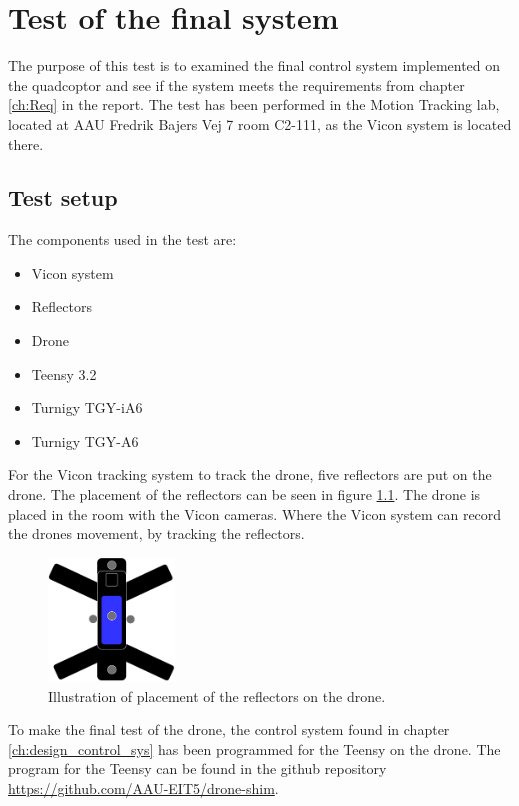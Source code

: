 \chapter{Test of the final system}\label{ap:final_test_report}

The purpose of this test is to examined the final control system implemented on the quadcoptor and see if the system meets the requirements from chapter \ref{ch:Req} in the report. The test has been performed in the Motion Tracking lab, located at AAU Fredrik Bajers Vej 7 room C2-111, as the Vicon system is located there. 


\section*{Test setup}
The components used in the test are:
\begin{itemize}
    \item{Vicon system}
    \item{Reflectors}
    \item{Drone}
    \item{Teensy 3.2} %
    \item{Turnigy TGY-iA6} %
    \item{Turnigy TGY-A6} %
\end{itemize}
For the Vicon tracking system to track the drone, five reflectors are put on the drone. The placement of the reflectors can be seen in figure \ref{fig:reflectors_final_test}.
The drone is placed in the room with the Vicon cameras. Where the Vicon system can record the drones movement, by tracking the reflectors. 

\begin{figure}[H]
    \centering
    \includegraphics[width=0.3\textwidth]{figures/Appendix/measuringTest/Reflector1.pdf}
    \caption{Illustration of placement of the reflectors on the drone.}
    \label{fig:reflectors_final_test}
\end{figure}

To make the final test of the drone, the control system found in chapter \ref{ch:design_control_sys} has been programmed for the Teensy on the drone. The program for the Teensy can be found in the github repository \url{https://github.com/AAU-EIT5/drone-shim}.

